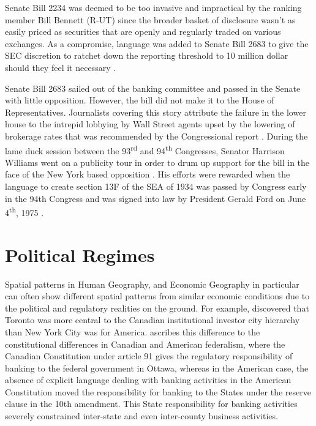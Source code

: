 Senate Bill 2234 was deemed to be too invasive and impractical by the ranking member Bill Bennett (R-UT) since the broader basket of disclosure wasn't as easily priced as securities that are openly and regularly traded on various exchanges.  As a compromise, language was added to Senate Bill 2683 to give the SEC discretion to ratchet down the reporting threshold to 10 million dollar should they feel it necessary \citep{Hearing71}. 
	
Senate Bill 2683 sailed out of the banking committee and passed in the Senate with little opposition.  However, the bill did not make it to the House of Representatives.  Journalists covering this story attribute the failure in the lower house to the intrepid lobbying by Wall Street agents upset by the lowering of brokerage rates that was recommended by the Congressional report \citep{Zimmerman1971}.  During the lame duck session between the 93\textsuperscript{rd} and  94\textsuperscript{th} Congresses, Senator Harrison Williams went on a publicity tour in order to drum up support for the bill in the face of the New York based opposition \citep{Dallos74,Dallos74a}.  His efforts were rewarded when the language to create section 13F of the SEA of 1934 was passed by Congress early in the 94{th} Congress and was signed into law by President Gerald Ford on June 4\textsuperscript{th}, 1975 \citep{libraryofcongress}. 
	
\section{Political Regimes}	

Spatial patterns in Human Geography, and Economic Geography in particular can often show different spatial patterns from similar economic conditions due to the political and regulatory realities on the ground.  For example, \cite{Lefebvre2014} discovered that Toronto was more central to the Canadian institutional investor city hierarchy than New York City was for America.  \cite{calomiris2013} ascribes this difference to the constitutional differences in Canadian and American federalism, where the Canadian Constitution under article 91 gives the regulatory responsibility of banking to the federal government in Ottawa, whereas in the American case, the absence of explicit language dealing with banking activities in the American Constitution moved the responsibility for banking to the States under the reserve clause in the 10th amendment. 
This State responsibility for banking activities severely constrained inter-state and even inter-county business activities. 


